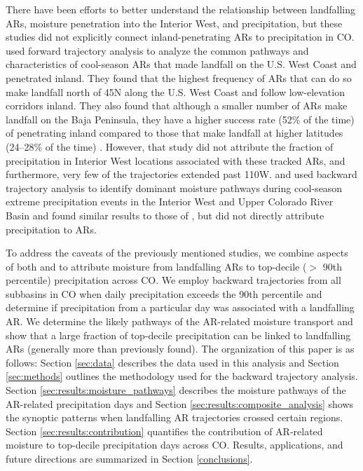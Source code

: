 \documentclass[draft]{agujournal2019}
\begin{document}
There have been efforts to better understand the relationship between landfalling ARs, moisture penetration into the Interior West, and precipitation, but these studies did not explicitly connect inland-penetrating ARs to precipitation in CO.  used forward trajectory analysis to analyze the common pathways and characteristics of cool-season ARs that made landfall on the U.S. West Coast and penetrated inland. They found that the highest frequency of ARs that can do so make landfall north of 45\textdegree N along the U.S. West Coast and follow low-elevation corridors inland. They also found that although a smaller number of ARs make landfall on the Baja Peninsula, they have a higher success rate (52\% of the time) of penetrating inland compared to those that make landfall at higher latitudes (24--28\% of the time) \cite{Rutz2015}. However, that study did not attribute the fraction of precipitation in Interior West locations associated with these tracked ARs, and furthermore, very few of the trajectories extended past 110\textdegree W.  and  used backward trajectory analysis to identify dominant moisture pathways during cool-season extreme precipitation events in the Interior West and Upper Colorado River Basin and found similar results to those of , but did not directly attribute precipitation to ARs.

To address the caveats of the previously mentioned studies, we combine aspects of both  and  to attribute moisture from landfalling ARs to top-decile ($>$ 90th percentile) precipitation across CO. We employ backward trajectories from all subbasins in CO when daily precipitation exceeds the 90th percentile and determine if precipitation from a particular day was associated with a landfalling AR. We determine the likely pathways of the AR-related moisture transport and show that a large fraction of top-decile precipitation can be linked to landfalling ARs (generally more than previously found). The organization of this paper is as follows: Section \ref{sec:data} describes the data used in this analysis and Section \ref{sec:methods} outlines the methodology used for the backward trajectory analysis. Section \ref{sec:results:moisture_pathways} describes the moisture pathways of the AR-related precipitation days and Section \ref{sec:results:composite_analysis} shows the synoptic patterns when landfalling AR trajectories crossed certain regions. Section \ref{sec:results:contribution} quantifies the contribution of AR-related moisture to top-decile precipitation days across CO. Results, applications, and future directions are summarized in Section \ref{conclusions}. 
\end{document}
